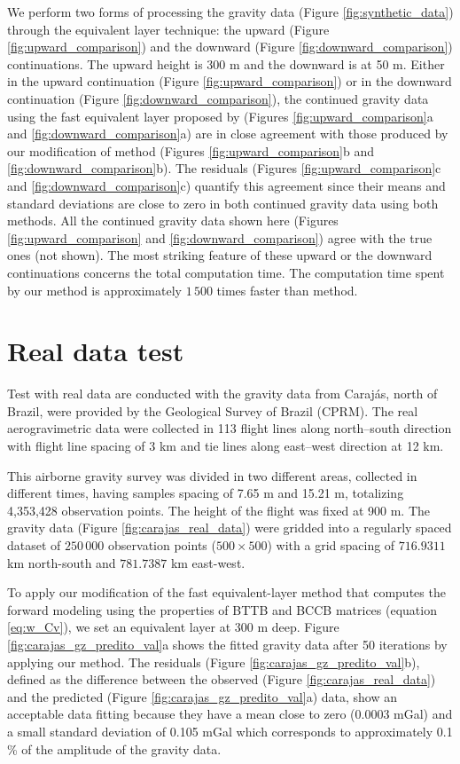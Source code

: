 \documentclass[manuscript,revised]{geophysics}
\begin{document}
We perform two forms of processing the gravity data (Figure \ref{fig:synthetic_data}) through the equivalent layer technique: the upward (Figure \ref{fig:upward_comparison}) and the downward (Figure \ref{fig:downward_comparison}) continuations. The upward height is 300 m and the downward  is at 50 m.   Either in the upward continuation (Figure \ref{fig:upward_comparison}) or in the downward continuation (Figure \ref{fig:downward_comparison}), the continued gravity data using the fast equivalent layer proposed by \citet{siqueira-etal2017} (Figures \ref{fig:upward_comparison}a and \ref{fig:downward_comparison}a) are in close agreement with those produced by our modification of \citet{siqueira-etal2017} method (Figures \ref{fig:upward_comparison}b and \ref{fig:downward_comparison}b). The residuals (Figures \ref{fig:upward_comparison}c and \ref{fig:downward_comparison}c) quantify this agreement since their means and standard deviations are close to zero in both continued gravity data using both methods.  All the continued gravity data shown here (Figures \ref{fig:upward_comparison} and \ref{fig:downward_comparison}) agree with the true ones (not shown). The most striking feature of these upward or the downward continuations concerns the total computation time. The computation time spent by our method is approximately $1\,500$ times faster than \citet{siqueira-etal2017} method. 


\section{Real data test}
Test with real data are conducted with the gravity data from Caraj\'as, north of Brazil, were provided by the  Geological Survey of Brazil (CPRM). The real aerogravimetric data were collected in 113 flight lines along north–south direction with flight line spacing  of 3 km and tie lines along east–west direction at 12 km.

This airborne gravity survey was divided in two different areas, collected in different times, having samples spacing of 7.65 m and 15.21 m, totalizing  4,353,428 observation points. The height of the flight was fixed at 900 m. The gravity data (Figure \ref{fig:carajas_real_data}) were gridded into a regularly spaced dataset of $250\,000$ observation points ($500 \times 500$) with a grid spacing of $716.9311$ km north-south and $781.7387$ km east-west.

To apply our modification of the fast equivalent-layer method \cite[]{siqueira-etal2017}  that computes the forward modeling using the properties of BTTB and BCCB matrices (equation \ref{eq:w_Cv}), we set an equivalent layer at 300 m deep. Figure \ref{fig:carajas_gz_predito_val}a shows the fitted gravity data after 50 iterations by applying our method. The residuals (Figure \ref{fig:carajas_gz_predito_val}b), defined as the difference between the observed (Figure \ref{fig:carajas_real_data}) and the predicted (Figure \ref{fig:carajas_gz_predito_val}a) data,  show an acceptable data fitting because they have a mean close to zero (0.0003 mGal) and a small standard deviation of 0.105 mGal which corresponds to approximately 0.1 \% of the amplitude of the gravity data.
\end{document}
